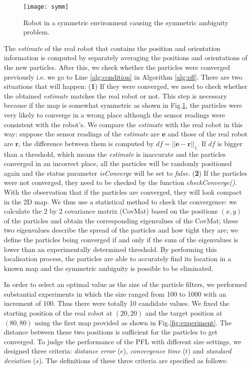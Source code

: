 \begin{figure}[h]
\centering
  \texttt{[image: symm]}
  \caption{Robot in a symmetric environment causing the symmetric ambiguity problem.}
  \label{fig:symm}
\end{figure}

The {\itshape estimate} of the real robot that contains the position and orientation information is computed by separately averaging the positions and orientations of the new particles. After this, we check whether the particles were converged previously i.e. we go to Line \ref{alg:condition} in Algorithm \ref{alg:pfl}. There are two situations that will happen: (\textbf{1}) If they were converged, we need to check whether the obtained {\itshape estimate} matches the real robot or not. This step is necessary because if the map is somewhat symmetric as shown in Fig.\ref{fig:symm}, the particles were very likely to converge in a wrong place although the sensor readings were consistent with the robot's. We compare the {\itshape estimate} with the real robot in this way: suppose the sensor readings of the {\itshape estimate} are $\mathbf{e}$ and those of the real robot are $\mathbf{r}$, the difference between them is computed by $df=||\mathbf{e}-\mathbf{r}||_{1}$. If $df$ is bigger than a threshold, which means the {\itshape estimate} is inaccurate and the particles converged in an incorrect place, all the particles will be randomly positioned again and the status parameter {\itshape isConverge} will be set to {\itshape false}. (\textbf{2}) If the particles were not converged, they need to be checked by the function {\itshape checkConverge()}. With the observation that if the particles are converged, they will look compact in the 2D map. We thus use a statistical method to check the convergence: we calculate the 2 by 2 covariance matrix (CovMat) based on the positions $(x,y)$ of the particles and obtain the corresponding eigenvalues of the CovMat; these two eigenvalues describe the spread of the particles and how tight they are; we define the particles being converged if and only if the sum of the eigenvalues is lower than an experimentally determined threshold. By performing this localisation process, the particles are able to accurately find its location in a known map and the symmetric ambiguity is possible to be eliminated.

In order to select an optimal value as the size of the particle filters, we performed substantial experiments in which the size ranged from 100 to 1000 with an increment of 100. Thus there were totally 10 candidate values. We fixed the starting position of the real robot at $(20,20)$ and the target position at $(80,80)$ using the first map provided as shown in Fig.\ref{fig:experiment}. The distance between these two positions is sufficient for the particles to get converged. To judge the performance of the PFL with different size settings, we designed three criteria: {\itshape distance error} ($e$), {\itshape convergence time} ($t$) and {\itshape standard deviation} ($s$). The definitions of these three criteria are specified as follows:

